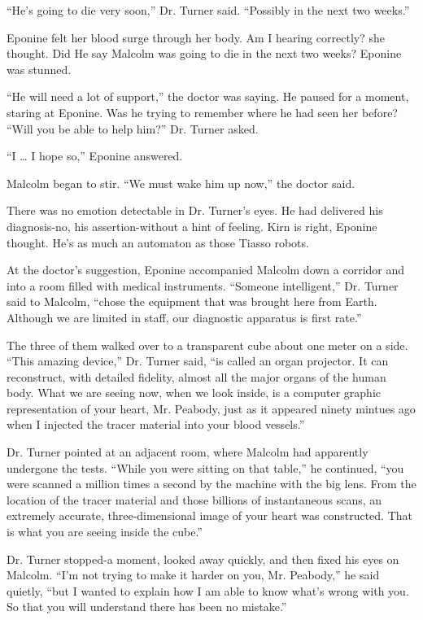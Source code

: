 \documentclass[]{article}
\begin{document}
{“He’s going to die very soon,” Dr.  Turner said.  “Possibly in the next two weeks.”

Eponine felt her blood surge through her body.  Am I hearing correctly? she thought.  Did He say Malcolm was going to die in the next two weeks? Eponine was stunned.

“He will need a lot of support,” the doctor was saying.  He paused for a moment, staring at Eponine.  Was he trying to remember where he had seen her before? “Will you be able to help him?” Dr.  Turner asked.

“I … I hope so,” Eponine answered.

Malcolm began to stir.  “We must wake him up now,” the doctor said.

There was no emotion detectable in Dr.  Turner’s eyes.  He had delivered his diagnosis-no, his assertion-without a hint of feeling.  Kirn is right, Eponine thought.  He’s as much an automaton as those Tiasso robots.

At the doctor’s suggestion, Eponine accompanied Malcolm down a corridor and into a room filled with medical instruments.  “Someone intelligent,” Dr.  Turner said to Malcolm, “chose the equipment that was brought here from Earth.  Although we are limited in staff, our diagnostic apparatus is first rate.”

The three of them walked over to a transparent cube about one meter on a side.  “This amazing device,” Dr.  Turner said, “is called an organ projector.  It can reconstruct, with detailed fidelity, almost all the major organs of the human body.  What we are seeing now, when we look inside, is a computer graphic representation of your heart, Mr.  Peabody, just as it appeared ninety mintues ago when I injected the tracer material into your blood vessels.”

Dr.  Turner pointed at an adjacent room, where Malcolm had apparently undergone the tests.  “While you were sitting on that table,” he continued, “you were scanned a million times a second by the machine with the big lens.  From the location of the tracer material and those billions of instantaneous scans, an extremely accurate, three-dimensional image of your heart was constructed.  That is what you are seeing inside the cube.”

Dr.  Turner stopped-a moment, looked away quickly, and then fixed his eyes on Malcolm.  “I’m not trying to make it harder on you, Mr.  Peabody,” he said quietly, “but I wanted to explain how I am able to know what’s wrong with you.  So that you will understand there has been no mistake.”

}
\end{document}
